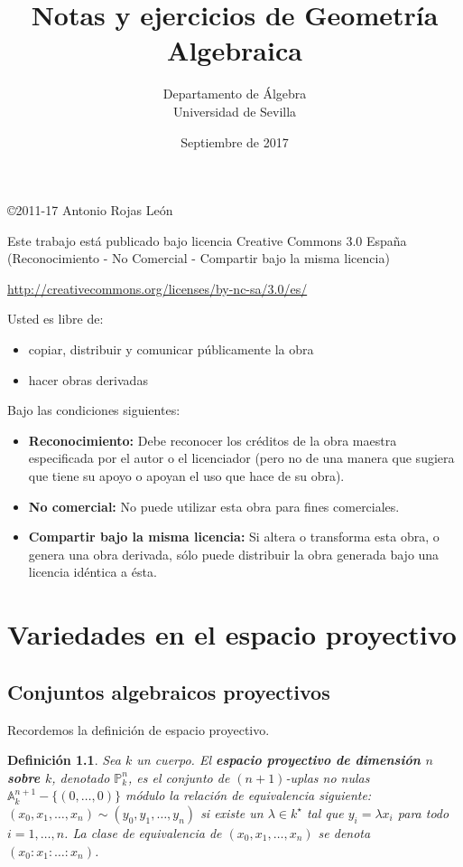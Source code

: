 \documentclass[a4paper,10pt]{book}
\title{Notas y ejercicios de Geometría Algebraica}
\author{Departamento de Álgebra \\ Universidad de Sevilla}
\date{Septiembre de 2017}
\newtheorem{defn}[thm]{Definición}
\newcommand{\AAA}{\mathbb A}
\newcommand{\PP}{\mathbb P}
\newcommand{\Pnk}{\PP^n_k}
\begin{document}
\setcounter{chapter}{1}
\maketitle

\vspace*{\fill}

\copyright{2011-17 Antonio Rojas León}

\bigskip

Este trabajo está publicado bajo licencia Creative Commons 3.0 España (Reconocimiento - No Comercial - Compartir bajo la misma licencia)

\url{http://creativecommons.org/licenses/by-nc-sa/3.0/es/}

\bigskip

Usted es libre de:
\begin{itemize}
 \item copiar, distribuir y comunicar públicamente la obra
\item hacer obras derivadas
\end{itemize}

Bajo las condiciones siguientes:
\begin{itemize}
 \item {\bf Reconocimiento:} Debe reconocer los créditos de la obra maestra especificada por el autor o el licenciador (pero no de una manera que sugiera que tiene su apoyo o apoyan el uso que hace de su obra).
 \item {\bf No comercial:} No puede utilizar esta obra para fines comerciales.
\item {\bf Compartir bajo la misma licencia:} Si altera o transforma esta obra, o genera una obra derivada, sólo puede distribuir la obra generada bajo una licencia idéntica a ésta.
\end{itemize}




\newpage

\chapter{Variedades en el espacio proyectivo}

\section{Conjuntos algebraicos proyectivos}

Recordemos la definición de espacio proyectivo.

\begin{defn}
 Sea $k$ un cuerpo. El {\bf espacio proyectivo de dimensión $n$ sobre $k$}, denotado $\Pnk$, es el conjunto de $(n+1)$-uplas no nulas $\AAA^{n+1}_k-\{(0,\ldots,0)\}$ módulo la relación de equivalencia siguiente: $(x_0,x_1,\ldots,x_n)\sim(y_0,y_1,\ldots,y_n)$ si existe un $\lambda\in k^\star$ tal que $y_i=\lambda x_i$ para todo $i=1,\ldots,n$. La clase de equivalencia de $(x_0,x_1,	\ldots,x_n)$ se denota $(x_0:x_1:\ldots:x_n)$.
\end{defn}
\end{document}
